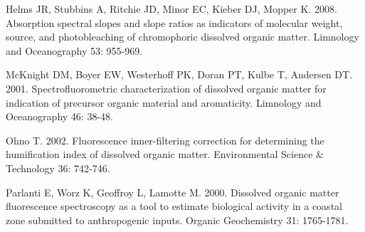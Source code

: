 \documentclass[a4paper,11pt]{article}\usepackage[]{graphicx}\usepackage[]{color}
\begin{document}
Helms JR, Stubbins A, Ritchie JD, Minor EC, Kieber DJ, Mopper K. 2008. Absorption spectral slopes and slope ratios as indicators of molecular weight, source, and photobleaching of chromophoric dissolved organic matter. Limnology and Oceanography 53: 955-969.

McKnight DM, Boyer EW, Westerhoff PK, Doran PT, Kulbe T, Andersen DT. 2001. Spectrofluorometric characterization of dissolved organic matter for indication of precursor organic material and aromaticity. Limnology and Oceanography 46: 38-48.

Ohno T. 2002. Fluorescence inner-filtering correction for determining the humification index of dissolved organic matter. Environmental Science & Technology 36: 742-746.

Parlanti E, Worz K, Geoffroy L, Lamotte M. 2000. Dissolved organic matter fluorescence spectroscopy as a tool to estimate biological activity in a coastal zone submitted to anthropogenic inputs. Organic Geochemistry 31: 1765-1781.
\end{document}
